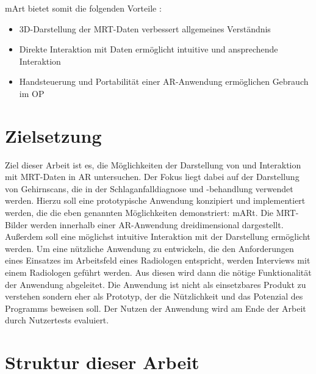 mArt bietet somit die folgenden Vorteile :

\begin{itemize}
\item 3D-Darstellung der MRT-Daten verbessert allgemeines Verständnis 
\item Direkte Interaktion mit Daten ermöglicht intuitive und ansprechende Interaktion
\item Handsteuerung und Portabilität einer AR-Anwendung ermöglichen Gebrauch im OP
\end{itemize}


\section{Zielsetzung}

Ziel dieser Arbeit ist es, die Möglichkeiten der Darstellung von und Interaktion mit MRT-Daten in AR untersuchen. Der Fokus liegt dabei auf der Darstellung von Gehirnscans, die in der Schlaganfalldiagnose und -behandlung verwendet werden.
Hierzu soll eine prototypische Anwendung konzipiert und implementiert werden, die die eben genannten Möglichkeiten demonstriert: mARt.
Die MRT-Bilder werden innerhalb einer AR-Anwendung dreidimensional dargestellt. Außerdem soll eine möglichst intuitive Interaktion mit der Darstellung ermöglicht werden. 
Um eine nützliche Anwendung zu entwickeln, die den Anforderungen eines Einsatzes im Arbeitsfeld eines Radiologen entspricht, werden Interviews mit einem Radiologen geführt werden. Aus diesen wird dann die nötige Funktionalität der Anwendung abgeleitet. 
Die Anwendung ist nicht als einsetzbares Produkt zu verstehen sondern eher als Prototyp, der die Nützlichkeit und das Potenzial des Programms beweisen soll. Der Nutzen der Anwendung wird am Ende der Arbeit durch Nutzertests evaluiert.


\section{Struktur dieser Arbeit}

